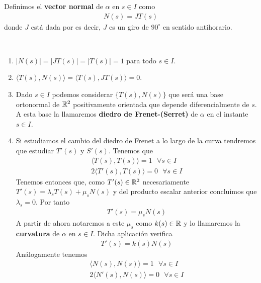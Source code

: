 \begin{definicion}
    Definimos el \textbf{vector normal} de $\alpha$ en $s\in I$ como
    \begin{gather*}
        N(s) = JT(s)
    \end{gather*}
    donde $J$ está dada por 
    es decir, $J$ es un giro de $90^\circ$ en sentido antihorario.
\end{definicion}

\begin{propiedades}\
    \begin{enumerate}
        \item $|N(s)| = |JT(s)| = |T(s)| = 1$ para todo $s\in I$.
        \item $\langle T(s), N(s) \rangle = \langle T(s), JT(s) \rangle = 0$.
        \item Dado $s\in I$ podemos considerar $\{T(s), N(s)\}$ que será una base ortonormal de $\mathbb{R}^2$ positivamente orientada que depende diferencialmente de $s$. A esta base la llamaremos \textbf{diedro de Frenet-(Serret)} de $\alpha$ en el instante $s\in I$.
        \item Si estudiamos el cambio del diedro de Frenet a lo largo de la curva tendremos que estudiar $T'(s)$ y $S'(s)$. Tenemos que 
        \begin{gather*}
            \langle T(s), T(s) \rangle = 1 \ \ \ \forall s\in I\\
            2\langle T'(s), T(s) \rangle = 0 \ \ \ \forall s \in I
        \end{gather*}
        Tenemos entonces que, como $T'(s)\in \mathbb{R}^2$ necesariamente 
        $T'(s) = \lambda_s T(s) + \mu_s N(s)$ y del producto escalar anterior concluimos que $\lambda_s = 0$. Por tanto 
        \begin{gather*}
            T'(s) = \mu_s N(s)
        \end{gather*}
        A partir de ahora notaremos a este $\mu_s$ como $k(s)\in \mathbb{R}$ y lo llamaremos la \textbf{curvatura} de $\alpha$ en $s\in I$. Dicha aplicación verifica
        \begin{gather*}
            T'(s) = k(s)N(s)
        \end{gather*}
        Análogamente tenemos 
        \begin{gather*}
            \langle N(s), N(s) \rangle = 1 \ \ \ \forall s\in I\\
            2\langle N'(s), N(s) \rangle = 0 \ \ \ \forall s \in I
        \end{gather*}

\end{enumerate}
\end{propiedades}
